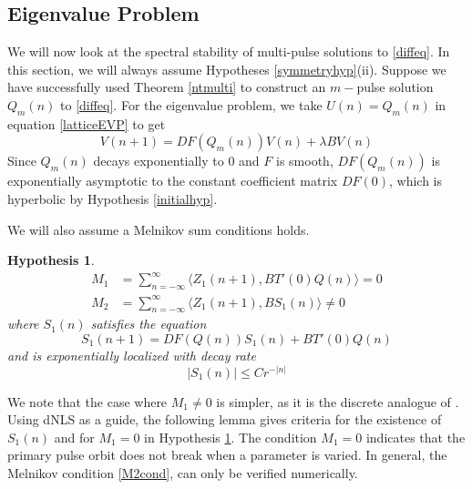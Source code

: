 \documentclass[12pt]{article}
\newtheorem{hypothesis}{Hypothesis}
\begin{document}
\subsection{Eigenvalue Problem}

We will now look at the spectral stability of multi-pulse solutions to \eqref{diffeq}. In this section, we will always assume Hypotheses \ref{symmetryhyp}(ii). Suppose we have successfully used Theorem \ref{ntmulti} to construct an $m-$pulse solution $Q_m(n)$ to \eqref{diffeq}. For the eigenvalue problem, we take $U(n) = Q_m(n)$ in equation \eqref{latticeEVP} to get
\begin{equation}\label{multiEVP}
V(n+1) = DF(Q_m(n)) V(n) + \lambda B V(n)
\end{equation}
Since $Q_m(n)$ decays exponentially to 0 and $F$ is smooth, $DF(Q_m(n))$ is exponentially asymptotic to the constant coefficient matrix $DF(0)$, which is hyperbolic by Hypothesis \ref{initialhyp}. 

We will also assume a Melnikov sum conditions holds.

\begin{hypothesis}\label{melnikovhyp}
\begin{align}
M_1 &= \sum_{n=-\infty}^\infty \langle Z_1(n+1), B T'(0)Q(n) \rangle = 0\label{M1cond}\\
M_2 &= \sum_{n=-\infty}^\infty \langle Z_1(n+1), B S_1(n) \rangle \neq 0 \label{M2cond}
\end{align}
where $S_1(n)$ satisfies the equation
\begin{equation}\label{S1def}
S_1(n+1) = DF(Q(n)) S_1(n) + B T'(0)Q(n)
\end{equation}
and is exponentially localized with decay rate
\begin{equation}\label{S1decay}
|S_1(n)| \leq C r^{-|n|}
\end{equation}
\end{hypothesis}
We note that the case where $M_1 \neq 0$ is simpler, as it is the discrete analogue of \cite{Sandstede1998}. Using dNLS as a guide, the following lemma gives criteria for the existence of $S_1(n)$ and for $M_1 = 0$ in Hypothesis \ref{melnikovhyp}. The condition $M_1 = 0$ indicates that the primary pulse orbit does not break when a parameter is varied. In general, the Melnikov condition \eqref{M2cond}, can only be verified numerically.
\end{document}
